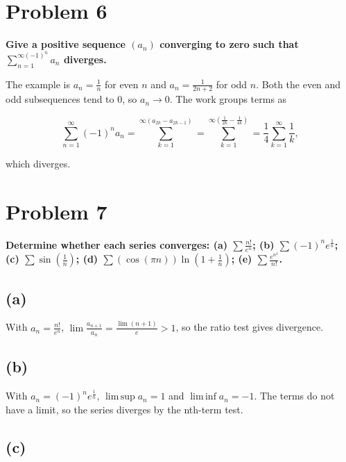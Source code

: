 \section{Problem 6}

\textbf{Give a positive sequence \(\left( a_{n} \right)\) converging to zero such that \(\sum_{n = 1}^{{\infty{({- 1})}}^{n}}a_{n}\) diverges.}

The example is \(a_{n} = \frac{1}{n}\) for even \(n\) and \(a_{n} = \frac{1}{2n + 2}\) for odd \(n\). Both the even and odd subsequences tend to \(0\), so \(a_{n}\rightarrow 0\). The work groups terms as

\[\sum\limits_{n = 1}^{\infty}\left( {- 1} \right)^{n}a_{n} = \sum\limits_{k = 1}^{\infty{({a_{2k} - a_{2k - 1}})}} = \sum\limits_{k = 1}^{\infty{({\frac{1}{2k} - \frac{1}{4k}})}} = \frac{1}{4}\sum\limits_{k = 1}^{\infty}\frac{1}{k},\]

which diverges.

\section{Problem 7}

\textbf{Determine whether each series converges: (a) \(\sum\frac{n!}{e^{n}}\); (b) \({\sum\left( {- 1} \right)}^{n}e^{\frac{1}{n}}\); (c) \(\sum\sin\left( \frac{1}{n} \right)\); (d) \(\sum\left( {\cos\left( {\pi n} \right)} \right)\ln\left( {1 + \frac{1}{n}} \right)\); (e) \(\sum\frac{e^{n^{2}}}{n!}\).}

\subsection{(a)}

With \(a_{n} = \frac{n!}{e^{n}}\), \(\lim\frac{a_{n + 1}}{a_{n}} = \frac{\lim\left( {n + 1} \right)}{e} > 1\), so the ratio test gives divergence.

\subsection{(b)}

With \(a_{n} = \left( {- 1} \right)^{n}e^{\frac{1}{n}}\), \(\operatorname{lim\, sup}a_{n} = 1\) and \(\operatorname{lim\, inf}a_{n} = - 1\). The terms do not have a limit, so the series diverges by the nth-term test.

\subsection{(c)}

